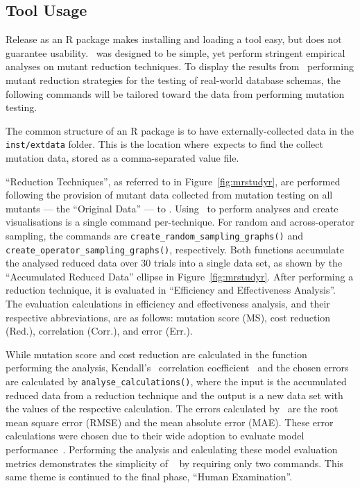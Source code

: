 \subsection{Tool Usage}



Release as an R package makes installing and loading a tool easy, but does not guarantee usability.
\mr~was designed to be simple, yet perform stringent empirical analyses on mutant reduction techniques.
To display the results from \mr~performing mutant reduction strategies for the testing of real-world
database schemas, the following commands will be tailored toward the data from performing mutation
testing.

The common structure of an R package is to have externally-collected data in the \texttt{inst/extdata}
folder. This is the location where~\mr expects to find the collect mutation data, stored as a
comma-separated value file.

``Reduction Techniques'', as referred to in Figure~\ref{fig:mrstudyr}, are performed following the
provision of mutant data collected from mutation testing on all mutants --- the ``Original Data'' ---
to \mr. Using \mr~to perform analyses and create visualisations is a single command per-technique.
For random and across-operator sampling, the commands are {\texttt{create\_random\_sampling\_graphs()}}
and {\texttt{create\_operator\_sampling\_graphs()}}, respectively. Both functions accumulate the analysed
reduced data over 30 trials into a single data set, as shown by the ``Accumulated Reduced Data'' ellipse
in Figure~\ref{fig:mrstudyr}. After performing a reduction technique, it is evaluated in ``Efficiency and
Effectiveness Analysis''. The evaluation calculations in efficiency and effectiveness analysis, and their
respective abbreviations, are as follows: mutation score (MS), cost reduction (Red.), correlation (Corr.),
and error (Err.).


While mutation score and cost reduction are calculated in the function performing the analysis, Kendall's
\taub~correlation coefficient~\cite{mcminn2016virtual} and the chosen errors are calculated by
\texttt{analyse\_calculations()}, where the input is the accumulated reduced data from a reduction technique
and the output is a new data set with the values of the respective calculation.  The errors calculated by
\mr~are the root mean square error (RMSE) and the mean absolute error (MAE).  These error calculations were
chosen due to their wide adoption to evaluate model performance~\cite{chai2014root}. Performing the analysis
and calculating these model evaluation metrics demonstrates the simplicity of \mr~ by requiring only two
commands. This same theme is continued to the final phase, ``Human Examination''.

